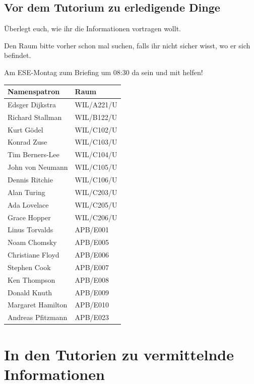 \documentclass[a4paper,12pt]{report}
\begin{document}
\section{Vor dem Tutorium zu erledigende Dinge}
\begin{itemize*}
\item Überlegt euch, wie ihr die Informationen vortragen wollt.
\item Den Raum bitte vorher schon mal suchen, falls ihr nicht sicher wisst, wo er sich befindet.
\item Am ESE-Montag zum Briefing um 08:30 da sein und mit helfen!
\end{itemize*}
\label{tabelle}
\begin{center}
\vspace{1cm}
\begin{tabular}[h]{|l|l|}
	\hline
	\textbf{Namenspatron}		& \textbf{Raum}\\ \hline
	Edsger Dijkstra				& WIL/A221/U\\
	Richard Stallman			& WIL/B122/U\\
	Kurt Gödel					& WIL/C102/U\\
	Konrad Zuse					& WIL/C103/U\\
	Tim Berners-Lee				& WIL/C104/U\\
	John von Neumann			& WIL/C105/U\\
	Dennis Ritchie				& WIL/C106/U\\
	Alan Turing 				& WIL/C203/U\\
	Ada Lovelace				& WIL/C205/U\\
	Grace Hopper				& WIL/C206/U\\
	Linus Torvalds				& APB/E001\\
	Noam Chomsky				& APB/E005\\
	Christiane Floyd			& APB/E006\\
	Stephen Cook				& APB/E007\\
	Ken Thompson				& APB/E008\\
	Donald Knuth				& APB/E009\\
	Margaret Hamilton			& APB/E010\\
	Andreas Pfitzmann			& APB/E023\\
	\hline
\end{tabular}
\end{center}

\chapter{In den Tutorien zu vermittelnde Informationen}
\end{document}
